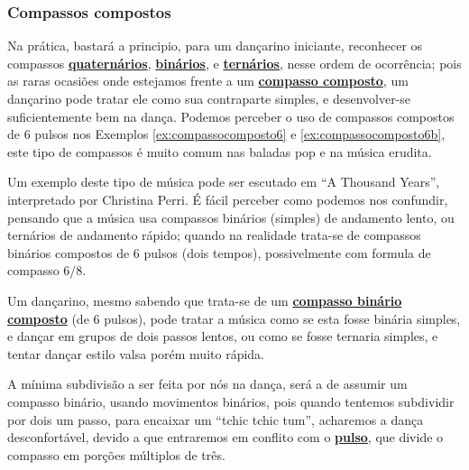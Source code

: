 \subsubsection{Compassos compostos}
Na prática, bastará a principio, para um dançarino iniciante,
reconhecer os compassos \hyperref[subsec:compassoquaternario]{\textbf{quaternários}}, 
\hyperref[subsec:compassobinario]{\textbf{binários}}, e 
\hyperref[subsec:compassoternario]{\textbf{ternários}},
nesse ordem de ocorrência;
pois as raras ocasiões onde estejamos frente a um \hyperref[sec:compaso]{\textbf{compasso composto}},
um dançarino pode tratar ele como sua contraparte simples,
e desenvolver-se suficientemente bem na dança. 
Podemos perceber o uso de compassos compostos de 6 pulsos nos Exemplos \ref{ex:compassocomposto6}
e \ref{ex:compassocomposto6b},
este tipo de compassos é muito comum nas baladas pop e na música erudita.
\begin{example}
\label{ex:compassocomposto6}
Um exemplo deste tipo de música pode ser escutado em ``A Thousand Years'', 
interpretado por Christina Perri. É fácil perceber como podemos nos confundir,
pensando que a música usa compassos binários (simples) de andamento lento,
ou ternários de andamento rápido; quando na realidade trata-se de compassos binários compostos de 6 pulsos (dois tempos),
possivelmente com formula de compasso 6/8.

Um dançarino, mesmo sabendo que trata-se de um \hyperref[compasso:binario]{\textbf{compasso binário composto}} (de 6 pulsos),
pode tratar a música como se esta fosse binária simples, e dançar em grupos de dois passos lentos,
ou como se fosse ternaria simples, e tentar dançar estilo valsa porém muito rápida.

A mínima subdivisão a ser feita por nós na dança, 
será a de assumir um compasso binário, usando movimentos binários,
pois quando tentemos subdividir por dois um passo, para encaixar um ``tchic tchic tum'',
acharemos a dança desconfortável, devido a que
entraremos em conflito com o \hyperref[ref:Pulso]{\textbf{pulso}}, 
que divide o compasso em porções múltiplos de três.
  
\end{example}

